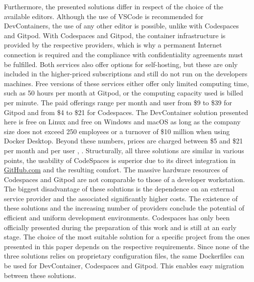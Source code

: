         Furthermore, the presented solutions differ in respect of the choice of the available editors. Although the use of \ac{VSCode} is recommended for DevContainers, the use of any other editor is possible, unlike with Codespaces and Gitpod. With Codespaces and Gitpod, the container infrastructure is provided by the respective providers, which is why a permanent Internet connection is required and the compliance with confidentiality agreements must be fulfilled. Both services also offer options for self-hosting, but these are only included in the higher-priced subscriptions and still do not run on the developers machines. Free versions of these services either offer only limited computing time, such as 50 hours per month at Gitpod, or the computing capacity used is billed per minute. The paid offerings range per month and user from \$9 to \$39 for Gitpod and from \$4 to \$21 for Codespaces. The DevContainer solution presented here is free on Linux and free on Windows and macOS as long as the company size does not exceed 250 employees or a turnover of \$10 million when using Docker Desktop. Beyond these numbers, prices are charged between \$5 and \$21 per month and per user \cite{gitpod}, \cite{githubblogcodespace}.\newline
        Structurally, all three solutions are similar in various points, the usability of CodeSpaces is superior due to its direct integration in \href{https://www.GitHub.com}{GitHub.com} and the resulting comfort. The massive hardware resources of Codespaces and Gitpod are not comparable to those of a developer workstation. The biggest disadvantage of these solutions is the dependence on an external service provider and the associated significantly higher costs. The existence of these solutions and the increasing number of providers conclude the potential of efficient and uniform development environments. Codespaces has only been officially presented during the preparation of this work and is still at an early stage.
        The choice of the most suitable solution for a specific project from the ones presented in this paper depends on the respective requirements. Since none of the three solutions relies on proprietary configuration files, the same Dockerfiles can be used for DevContainer, Codespaces and Gitpod. This enables easy migration between these solutions.


